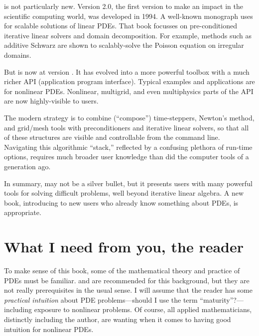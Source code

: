 \PETSc is not particularly new.  Version 2.0, the first version to make an impact in the scientific computing world, was developed in 1994.  A well-known monograph \citet{Smithetal1996} uses  for scalable solutions of linear PDEs.  That book focusses on pre-conditioned iterative linear solvers and domain decomposition.  For example, methods such as additive Schwarz are shown to scalably-solve the Poisson equation on irregular domains.

But \PETSc is now at version \PETSCVERSION.  It has evolved into a more powerful toolbox with a much richer API (application program interface).  Typical examples and applications are for nonlinear PDEs.  Nonlinear, multigrid, and even multiphysics parts of the API are now highly-visible to users.

The modern \PETSc strategy is to combine (``compose'') time-steppers, Newton's method, and grid/mesh tools with preconditioners and iterative linear solvers, so that all of these structures are visible and controllable from the command line.  Navigating this algorithmic ``stack,'' reflected by a confusing plethora of run-time options, requires much broader user knowledge than did the computer tools of a generation ago.

In summary, \PETSc may not be a silver bullet, but it presents users with many powerful tools for solving difficult problems, well beyond iterative linear algebra.  A new book, introducing \PETSc to new users who already know something about PDEs, is appropriate.


\section{What I need from you, the reader}

To make sense of this book, some of the mathematical theory and practice of PDEs must be familiar.  \citet{Evans2010} and \citet{Ockendonetal2003} are recommended for this background, but they are not really prerequisites in the usual sense.  I will assume that the reader has some \emph{practical intuition} about PDE problems---should I use the term ``maturity''?---including exposure to nonlinear problems.  Of course, all applied mathematicians, distinctly including the author, are wanting when it comes to having good intuition for nonlinear PDEs.


